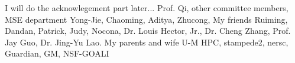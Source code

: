 I will do the acknowlegement part later...
Prof. Qi, other committee members, MSE department
Yong-Jie, Chaoming, Aditya, Zhucong, 
My friends Ruiming, Dandan, Patrick, Judy,
Nocona, 
Dr. Louis Hector, Jr., Dr. Cheng Zhang, Prof. Jay Guo, Dr. Jing-Yu Lao.
My parents and wife
U-M HPC, stampede2, nersc,
Guardian, GM, NSF-GOALI